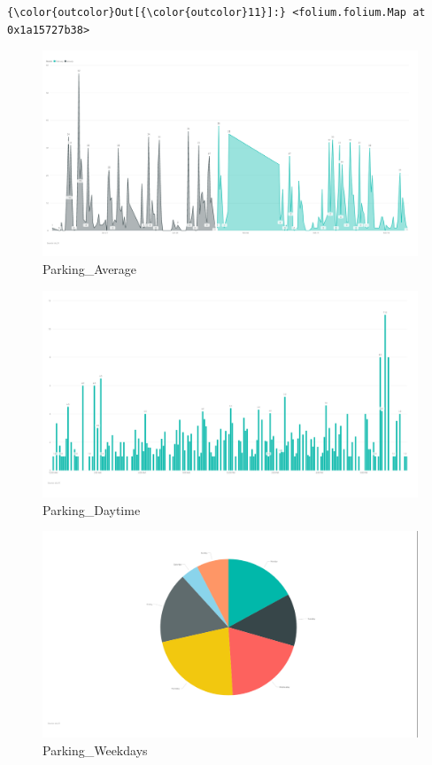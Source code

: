 \documentclass[11pt]{article}
\makeatletter
\def\maxwidth{\ifdim\Gin@nat@width>\linewidth\linewidth
    \else\Gin@nat@width\fi}
\let\Oldincludegraphics\includegraphics
\renewcommand{\includegraphics}[1]{\Oldincludegraphics[width=.8\maxwidth]{#1}}
\makeatother
\begin{document}
\begin{Verbatim}[commandchars=\\\{\}]
{\color{outcolor}Out[{\color{outcolor}11}]:} <folium.folium.Map at 0x1a15727b38>
\end{Verbatim}
            
    \begin{figure}
\centering
\includegraphics{images/1_parking_average.PNG}
\caption{Parking\_Average}
\end{figure}

    \begin{figure}
\centering
\includegraphics{images/2_parking_daytime.PNG}
\caption{Parking\_Daytime}
\end{figure}

    \begin{figure}
\centering
\includegraphics{images/3_parking_weekdays.PNG}
\caption{Parking\_Weekdays}
\end{figure}
\end{document}
